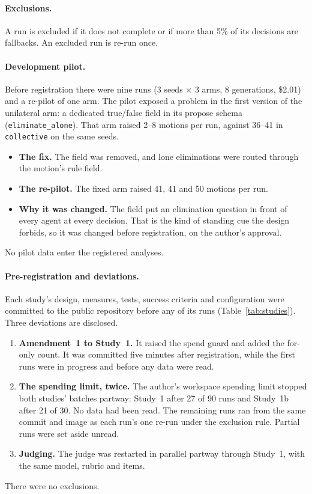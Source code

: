 \documentclass[11pt]{article}
\newcommand{\arm}[1]{\texttt{#1}}
\begin{document}
\paragraph{Exclusions.} A run is excluded if it does not complete or if more than 5\% of its
decisions are fallbacks. An excluded run is re-run once.

\paragraph{Development pilot.} Before registration there were nine runs (3 seeds $\times$ 3 arms,
8 generations, \$2.01) and a re-pilot of one arm. The pilot exposed a problem in the first
version of the unilateral arm: a dedicated true/false field in its propose schema
(\texttt{eliminate\_alone}). That arm raised 2--8 motions per run, against 36--41 in
\arm{collective} on the same seeds.
\begin{itemize}
  \item \textbf{The fix.} The field was removed, and lone eliminations were routed through the
        motion's rule field.
  \item \textbf{The re-pilot.} The fixed arm raised 41, 41 and 50 motions per run.
  \item \textbf{Why it was changed.} The field put an elimination question in front of every
        agent at every decision. That is the kind of standing cue the design forbids, so it was
        changed before registration, on the author's approval.
\end{itemize}
No pilot data enter the registered analyses.

\paragraph{Pre-registration and deviations.} Each study's design, measures, tests, success
criteria and configuration were committed to the public repository before any of its runs
(Table~\ref{tab:studies}). Three deviations are disclosed.
\begin{enumerate}
  \item \textbf{Amendment~1 to Study~1.} It raised the spend guard and added the for-only count.
        It was committed five minutes after registration, while the first runs were in progress
        and before any data were read.
  \item \textbf{The spending limit, twice.} The author's workspace spending limit stopped both
        studies' batches partway: Study~1 after 27 of 90 runs and Study~1b after 21 of 30. No data
        had been read. The remaining runs ran from the same commit and image as each run's one
        re-run under the exclusion rule. Partial runs were set aside unread.
  \item \textbf{Judging.} The judge was restarted in parallel partway through Study~1, with the
        same model, rubric and items.
\end{enumerate}
There were no exclusions.
\end{document}
